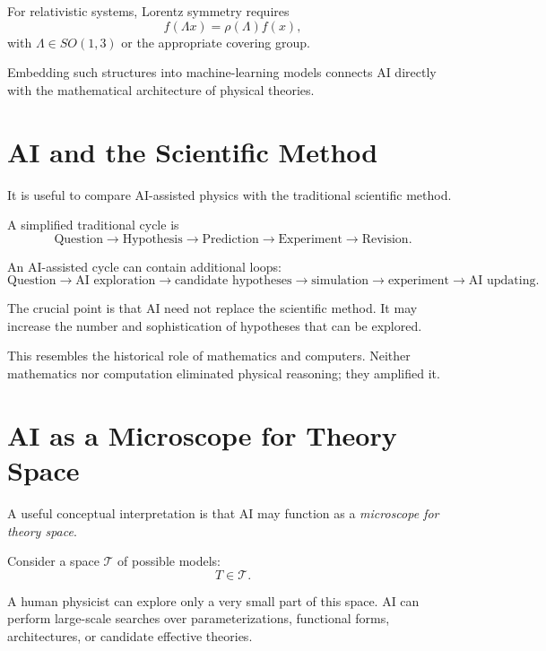 \documentclass[11pt,a4paper]{article}
\begin{document}
For relativistic systems, Lorentz symmetry requires
\begin{equation}
f(\Lambda x)=\rho(\Lambda)f(x),
\end{equation}
with $\Lambda\in SO(1,3)$ or the appropriate covering group.

Embedding such structures into machine-learning models connects AI directly with
the mathematical architecture of physical theories.

\section{AI and the Scientific Method}

It is useful to compare AI-assisted physics with the traditional scientific
method.

A simplified traditional cycle is
\begin{equation}
\boxed{
\text{Question}
\rightarrow
\text{Hypothesis}
\rightarrow
\text{Prediction}
\rightarrow
\text{Experiment}
\rightarrow
\text{Revision}.
}
\end{equation}

An AI-assisted cycle can contain additional loops:
\begin{equation}
\boxed{
\text{Question}
\rightarrow
\text{AI exploration}
\rightarrow
\text{candidate hypotheses}
\rightarrow
\text{simulation}
\rightarrow
\text{experiment}
\rightarrow
\text{AI updating}.
}
\end{equation}

The crucial point is that AI need not replace the scientific method. It may
increase the number and sophistication of hypotheses that can be explored.

This resembles the historical role of mathematics and computers. Neither
mathematics nor computation eliminated physical reasoning; they amplified it.

\section{AI as a Microscope for Theory Space}

A useful conceptual interpretation is that AI may function as a
\emph{microscope for theory space}.

Consider a space $\mathcal{T}$ of possible models:
\begin{equation}
T\in\mathcal{T}.
\end{equation}

A human physicist can explore only a very small part of this space. AI can
perform large-scale searches over parameterizations, functional forms,
architectures, or candidate effective theories.
\end{document}
